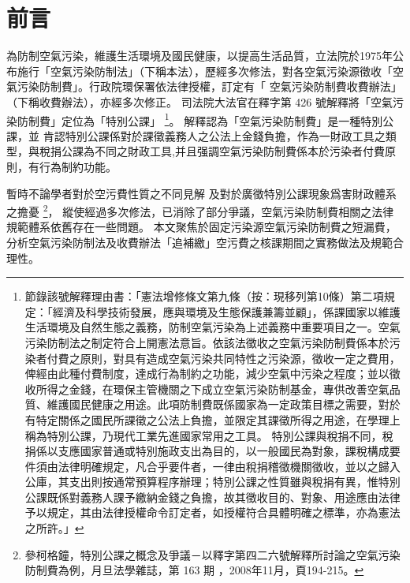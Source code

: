 
\section{前言}

為防制空氣污染，維護生活環境及國民健康，以提高生活品質，立法院於1975年公布施行「空氣污染防制法」（下稱本法），歷經多次修法，對各空氣污染源徵收「空氣污染防制費」。行政院環保署依法律授權，訂定有「	空氣污染防制費收費辦法」（下稱收費辦法），亦經多次修正。
司法院大法官在釋字第 426 號解釋將「空氣污染防制費」定位為「特別公課」
\footnote{節錄該號解釋理由書：「憲法增修條文第九條（按：現移列第10條）第二項規定：「經濟及科學技術發展，應與環境及生態保護兼籌並顧」，係課國家以維護生活環境及自然生態之義務，防制空氣污染為上述義務中重要項目之一。空氣污染防制法之制定符合上開憲法意旨。依該法徵收之空氣污染防制費係本於污染者付費之原則，對具有造成空氣污染共同特性之污染源，徵收一定之費用，俾經由此種付費制度，達成行為制約之功能，減少空氣中污染之程度；並以徵收所得之金錢，在環保主管機關之下成立空氣污染防制基金，專供改善空氣品質、維護國民健康之用途。此項防制費既係國家為一定政策目標之需要，對於有特定關係之國民所課徵之公法上負擔，並限定其課徵所得之用途，在學理上稱為特別公課，乃現代工業先進國家常用之工具。
特別公課與稅捐不同，稅捐係以支應國家普通或特別施政支出為目的，以一般國民為對象，課稅構成要件須由法律明確規定，凡合乎要件者，一律由稅捐稽徵機關徵收，並以之歸入公庫，其支出則按通常預算程序辦理；特別公課之性質雖與稅捐有異，惟特別公課既係對義務人課予繳納金錢之負擔，故其徵收目的、對象、用途應由法律予以規定，其由法律授權命令訂定者，如授權符合具體明確之標準，亦為憲法之所許。」}。
解釋認為「空氣污染防制費」是一種特別公課，並
肯認特別公課係對於課徵義務人之公法上金錢負擔，作為一財政工具之類型，與稅捐公課為不同之財政工具,并且强調空氣污染防制費係本於污染者付費原則，有行為制約功能。


暫時不論學者對於空污費性質之不同見解
及對於廣徵特別公課現象爲害財政體系之擔憂
\footnote{參柯格鐘，特別公課之概念及爭議－以釋字第四二六號解釋所討論之空氣污染防制費為例，月旦法學雜誌，第 163 期 ，2008年11月，頁194-215。}，
縱使經過多次修法，已消除了部分爭議，空氣污染防制費相關之法律規範體系依舊存在一些問題。
本文聚焦於固定污染源空氣污染防制費之短漏費，分析空氣污染防制法及收費辦法「追補繳」空污費之核課期間之實務做法及規範合理性。


